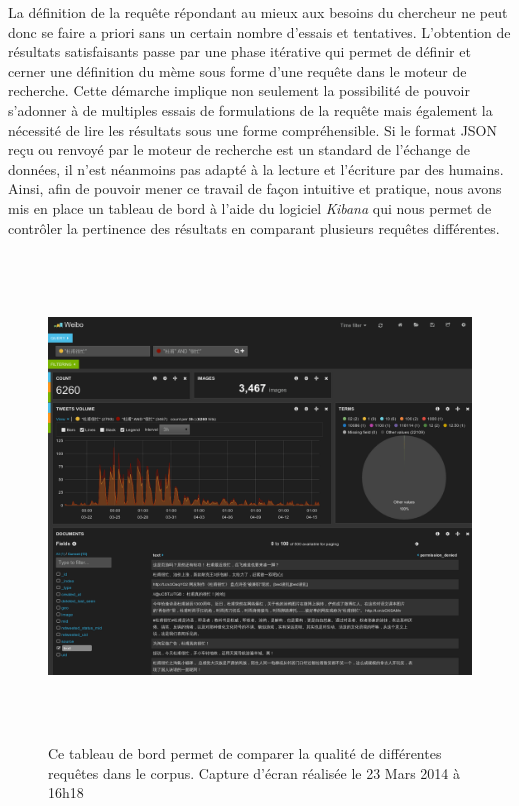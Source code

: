 La définition de la requête répondant au mieux aux besoins du chercheur  ne peut donc se faire a priori sans un certain nombre d'essais et tentatives. L'obtention de résultats satisfaisants passe par une phase itérative qui permet de définir et cerner une définition du mème sous forme d'une requête dans le moteur de recherche. Cette démarche implique non seulement la possibilité de pouvoir s'adonner à de multiples essais de formulations de la requête mais également la nécessité de lire les résultats sous une forme compréhensible. Si le format JSON reçu ou renvoyé par le moteur de recherche est un standard de l'échange de données, il n'est néanmoins pas adapté à la lecture et l'écriture par des humains. Ainsi, afin de pouvoir mener ce travail de façon intuitive et pratique, nous avons mis en place un tableau de bord à l'aide du logiciel \textit{Kibana} qui nous permet de contr\^oler la pertinence des résultats en comparant plusieurs requêtes différentes.

\begin{figure}[h!]
    \centering
    \includegraphics[width=6.0004in,height=5.078in]{figures/chap3/chapitre3-img20.png}
    \caption[Tableau de bords requêtes par mots-clés] { Ce tableau de bord permet de comparer la qualité de différentes requ\^etes dans le corpus. Capture d'écran réalisée le 23 Mars 2014 à 16h18}
\end{figure}

